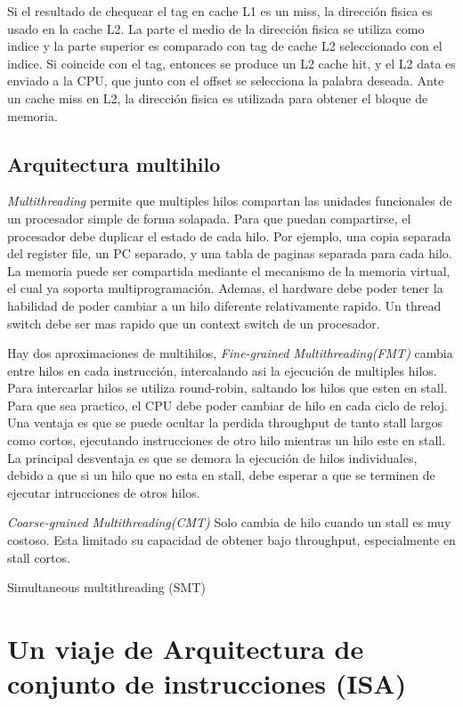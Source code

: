 \documentclass{article}
\begin{document}
Si el resultado de chequear el tag en cache L1 es un miss, la dirección fisica es usado en la cache L2. La parte el medio de la dirección fisica se utiliza como indice y la parte superior es comparado con tag de cache L2 seleccionado con el indice. Si coincide con el tag, entonces se produce un L2 cache hit, y el L2 data es enviado a la CPU, que junto con el offset se selecciona la palabra deseada.
Ante un cache miss en L2, la dirección fisica es utilizada para obtener el bloque de memoria.

\subsection{Arquitectura multihilo}

\textit{Multithreading} permite que multiples hilos compartan las unidades funcionales de un procesador simple de forma solapada. Para que puedan compartirse, el procesador debe duplicar el estado de cada hilo.
Por ejemplo, una copia separada del register file, un PC separado, y una tabla de paginas separada para cada hilo.
La memoria puede ser compartida mediante el mecanismo de la memoria virtual, el cual ya soporta multiprogramación.
Ademas, el hardware debe poder tener la habilidad de poder cambiar a un hilo diferente relativamente rapido. Un thread switch debe ser mas rapido que un context switch de un procesador.

Hay dos aproximaciones de multihilos, \textit{Fine-grained Multithreading(FMT)} cambia entre hilos en cada instrucción, intercalando asi la ejecución de multiples hilos. Para intercarlar hilos se utiliza round-robin, saltando los hilos que esten en stall. Para que sea practico, el CPU debe poder cambiar de hilo en cada ciclo de reloj.
Una ventaja es que se puede ocultar la perdida throughput de tanto stall largos como cortos, ejecutando instrucciones de otro hilo mientras un hilo este en stall. 
La principal desventaja es que se demora la ejecución de hilos individuales, debido a que si un hilo que no esta en stall, debe esperar a que se terminen de ejecutar intrucciones de otros hilos.

\textit{Coarse-grained Multithreading(CMT)} Solo cambia de hilo cuando un stall es muy costoso. Esta limitado su capacidad de obtener bajo throughput, especialmente en stall cortos.

Simultaneous multithreading (SMT)


\section{Un viaje de Arquitectura de conjunto de instrucciones (ISA)}
\end{document}
